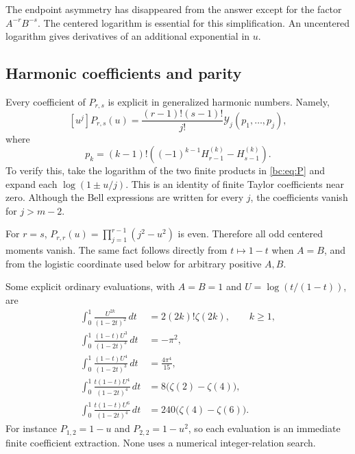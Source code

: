\documentclass[11pt,letterpaper]{article}
\numberwithin{equation}{section}
\theoremstyle{definition}
\theoremstyle{remark}
\newcommand{\bcY}{\mathcal Y}
\begin{document}
The endpoint asymmetry has disappeared from the answer except for the
factor $A^{-r}B^{-s}$. The centered logarithm is essential for this
simplification. An uncentered logarithm gives derivatives of an
additional exponential in $u$.

\subsection{Harmonic coefficients and parity}

Every coefficient of $P_{r,s}$ is explicit in generalized harmonic
numbers. Namely,
\begin{equation}\label{bc:eq:P-bell}
 [u^j]P_{r,s}(u)=\frac{(r-1)!(s-1)!}{j!}
               \bcY_j(p_1,\ldots,p_j),
\end{equation}
where
\begin{equation}\label{bc:eq:p-harmonic}
 p_k=(k-1)!\left((-1)^{k-1}H_{r-1}^{(k)}-H_{s-1}^{(k)}\right).
\end{equation}
To verify this, take the logarithm of the two finite products in
\eqref{bc:eq:P} and expand each $\log(1\pm u/j)$. This is an identity
of finite Taylor coefficients near zero. Although the Bell expressions
are written for every $j$, the coefficients vanish for $j>m-2$.

For $r=s$, $P_{r,r}(u)=\prod_{j=1}^{r-1}(j^2-u^2)$ is even. Therefore
all odd centered moments vanish. The same fact follows directly from
$t\mapsto1-t$ when $A=B$, and from the logistic coordinate used below
for arbitrary positive $A,B$.

Some explicit ordinary evaluations, with $A=B=1$ and
$U=\log(t/(1-t))$, are
\begin{align}
 \int_0^1\frac{U^{2k}}{(1-2t)^2}\,dt
     &=2(2k)!\zeta(2k),\qquad k\ge1,
                      \label{bc:eq:moment-11}\\
 \int_0^1\frac{(1-t)U^3}{(1-2t)^3}\,dt&=-\pi^2,
                      \label{bc:eq:moment-12a}\\
 \int_0^1\frac{(1-t)U^4}{(1-2t)^3}\,dt&=\frac{4\pi^4}{15},
                      \label{bc:eq:moment-12b}\\
 \int_0^1\frac{t(1-t)U^4}{(1-2t)^4}\,dt
       &=8\bigl(\zeta(2)-\zeta(4)\bigr),
                      \label{bc:eq:moment-22a}\\
 \int_0^1\frac{t(1-t)U^6}{(1-2t)^4}\,dt
       &=240\bigl(\zeta(4)-\zeta(6)\bigr).
                      \label{bc:eq:moment-22b}
\end{align}
For instance $P_{1,2}=1-u$ and $P_{2,2}=1-u^2$, so each evaluation is
an immediate finite coefficient extraction. None uses a numerical
integer-relation search.
\end{document}
